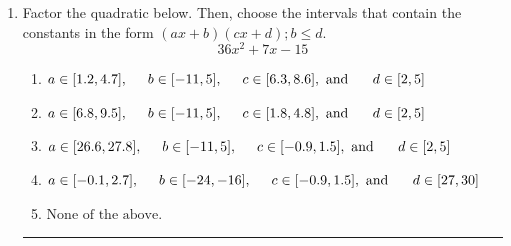 \documentclass[14pt]{extbook}
\newcommand{\litem}[1]{\item#1\hspace*{-1cm}\rule{\textwidth}{0.4pt}}
\begin{document}
\begin{enumerate}
{\begin{enumerate}[label=\Alph*.]
\end{enumerate} }
\litem{
Factor the quadratic below. Then, choose the intervals that contain the constants in the form $(ax+b)(cx+d); b \leq d.$\[ 36x^{2} +7 x -15 \]\begin{enumerate}[label=\Alph*.]
\item \( a \in [1.2, 4.7], \hspace*{5mm} b \in [-11, 5], \hspace*{5mm} c \in [6.3, 8.6], \text{ and } \hspace*{5mm} d \in [2, 5] \)
\item \( a \in [6.8, 9.5], \hspace*{5mm} b \in [-11, 5], \hspace*{5mm} c \in [1.8, 4.8], \text{ and } \hspace*{5mm} d \in [2, 5] \)
\item \( a \in [26.6, 27.8], \hspace*{5mm} b \in [-11, 5], \hspace*{5mm} c \in [-0.9, 1.5], \text{ and } \hspace*{5mm} d \in [2, 5] \)
\item \( a \in [-0.1, 2.7], \hspace*{5mm} b \in [-24, -16], \hspace*{5mm} c \in [-0.9, 1.5], \text{ and } \hspace*{5mm} d \in [27, 30] \)
\item \( \text{None of the above.} \)


\end{enumerate}}
\end{enumerate}
\end{document}
